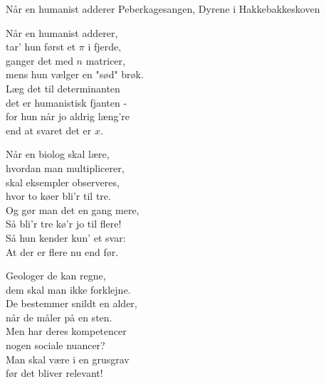 \begin{song}{Når en humanist adderer}
  {} %
  {Peberkagesangen, Dyrene i Hakkebakkeskoven} %
  {\TKET{}} %
  {} %
  {\NotCCLIed} %

  \begin{SBVerse}
    Når en humanist adderer,\\
    tar’ hun først et $\pi$ i fjerde,\\
    ganger det med $n$ matricer,\\
    mens hun vælger en "sød" brøk.\\
    Læg det til determinanten\\
    det er humanistisk fjanten -\\
    for hun når jo aldrig læng’re\\
    end at svaret det er $x$.
  \end{SBVerse}

  \begin{SBVerse}
    Når en biolog skal lære,\\
    hvordan man multiplicerer,\\
    skal eksempler observeres,\\
    hvor to køer bli’r til tre.\\
    Og gør man det en gang mere,\\
    Så bli’r tre kø’r jo til flere!\\
    Så hun kender kun’ et svar:\\
    At der er flere nu end før.
  \end{SBVerse}

  \begin{SBVerse}
    Geologer de kan regne,\\
    dem skal man ikke forklejne.\\
    De bestemmer snildt en alder,\\
    når de måler på en sten.\\
    Men har deres kompetencer\\
    nogen sociale nuancer?\\
    Man skal være i en grusgrav\\
    før det bliver relevant!
  \end{SBVerse}


\end{song}

